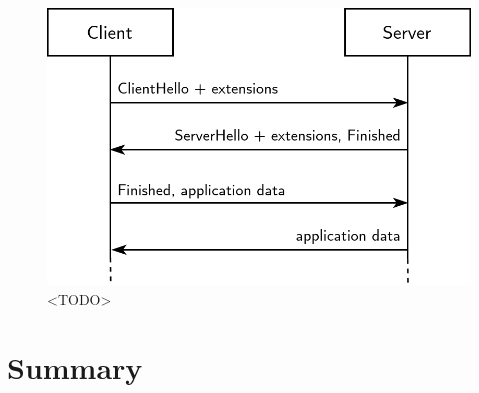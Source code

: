 \blindtext

\begin{figure}[ht]
\centerline{\includegraphics[width=120mm]{images/tls-handshake.png}}
\caption[Screenshot of Google Chrome when accessing tcd.example.com]{<TODO>}
\label{chrome_screenshot_figure}
\end{figure}











\section{Summary}

\blindtext
